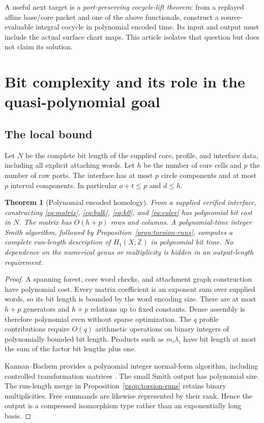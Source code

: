 \documentclass[11pt]{article}
\newtheorem{theorem}{Theorem}[section]
\theoremstyle{definition}
\theoremstyle{remark}
\newcommand{\Z}{\mathbb Z}
\begin{document}
A useful next target is a \emph{port-preserving cocycle-lift theorem}: from a
replayed affine base/core packet and one of the above functionals, construct
a source-evaluable integral cocycle in polynomial encoded time. Its input
and output must include the actual surface chart maps. This article isolates
that question but does not claim its solution.

\section{Bit complexity and its role in the quasi-polynomial goal}
\label{sec:complexity}

\subsection{The local bound}
Let $N$ be the complete bit length of the supplied core, profile, and
interface data, including all explicit attaching words. Let $h$ be the
number of core cells and $p$ the number of raw ports. The interface has at
most $p$ circle components and at most $p$ interval components. In
particular $o+t\leq p$ and $d\leq h$.

\begin{theorem}[Polynomial encoded homology]
\label{thm:complexity}
From a supplied verified interface, constructing \eqref{eq:matrix},
\eqref{eq:bulk}, \eqref{eq:h0}, and \eqref{eq:euler} has polynomial bit cost
in $N$. The matrix has $O(h+p)$ rows and columns. A polynomial-time integer
Smith algorithm, followed by Proposition~\ref{prop:torsion-runs}, computes
a complete run-length description of $H_1(X;\Z)$ in polynomial bit time.
No dependence on the numerical genus or multiplicity is hidden in an
output-length requirement.
\end{theorem}
\begin{proof}
A spanning forest, core word checks, and attachment graph construction
have polynomial cost. Every matrix coefficient is an exponent sum over
supplied words, so its bit length is bounded by the word encoding size.
There are at most $h+p$ generators and $h+p$ relations up to fixed constants.
Dense assembly is therefore polynomial even without sparse optimization.
The $q$ profile contributions require $O(q)$ arithmetic operations on binary
integers of polynomially bounded bit length. Products such as $m_i\lambda_i$
have bit length at most the sum of the factor bit lengths plus one.

Kannan--Bachem provides a polynomial integer normal-form algorithm, including
controlled transformation matrices \cite{kannan-bachem}. The small Smith
output has polynomial size. The run-length merge in
Proposition~\ref{prop:torsion-runs} retains binary multiplicities. Free
summands are likewise represented by their rank. Hence the output is a
compressed isomorphism type rather than an exponentially long basis.
\end{proof}
\end{document}
